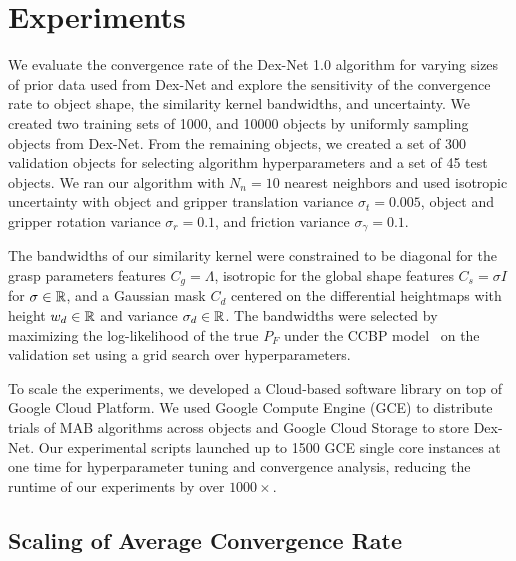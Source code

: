 \section{Experiments}


We evaluate the convergence rate of the Dex-Net 1.0 algorithm for varying sizes of prior data used from Dex-Net and explore the sensitivity of the convergence rate to object shape, the similarity kernel bandwidths, and uncertainty.
We created two training sets of 1000, and 10000 objects by uniformly sampling objects from Dex-Net.
From the remaining objects, we created a set of 300 validation objects for selecting algorithm hyperparameters and a set of 45 test objects.
We ran our algorithm with $N_n = 10$ nearest neighbors and used isotropic uncertainty with object and gripper translation variance $\sigma_{t} = 0.005$, object and gripper rotation variance $\sigma_{r} = 0.1$, and friction variance $\sigma_{\gamma} = 0.1$.

The bandwidths of our similarity kernel were constrained to be diagonal for the grasp parameters features $C_g = \Lambda$, isotropic for the global shape features $C_s = \sigma I$ for $\sigma \in \mathbb{R}$, and a Gaussian mask $C_d$ centered on the differential heightmaps with height $w_d \in \mathbb{R}$ and variance $\sigma_d \in \mathbb{R}$.
The bandwidths were selected by maximizing the log-likelihood of the true $P_F$ under the CCBP model~\cite{goetschalckx2011continuous} on the validation set using a grid search over hyperparameters.

To scale the experiments, we developed a Cloud-based software library on top of Google Cloud Platform.
We used Google Compute Engine (GCE) to distribute trials of MAB algorithms across objects and Google Cloud Storage to store Dex-Net.
Our experimental scripts launched up to 1500 GCE single core instances at one time for hyperparameter tuning and convergence analysis, reducing the runtime of our experiments by over $1000\times$.

\subsection{Scaling of Average Convergence Rate}


